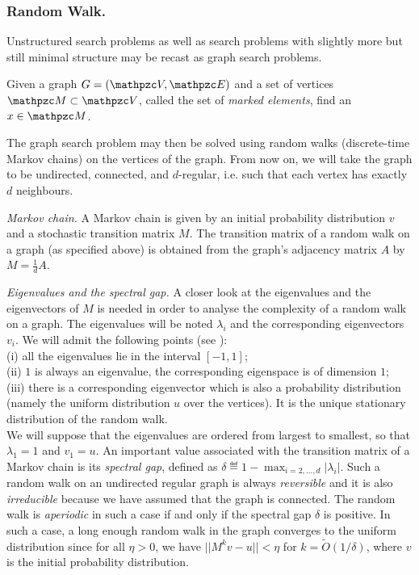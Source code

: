 \subsubsection{Random Walk.}
Unstructured search problems as well as search problems with slightly more but still minimal structure may be recast as graph search problems.
\begin{problem}
Given a graph $G=(\zV,\zE)$ and a set of vertices $\zM \subset \zV$, called the set of \textit{marked elements}, find an $x \in \zM$.
\end{problem}
The graph search problem may then be solved using random walks (discrete-time Markov chains) on the vertices of the graph.
From now on, we will take the graph to be undirected, connected, and $d$-regular, i.e. such that each vertex has exactly $d$ neighbours.
\par{\em Markov chain.}
A Markov chain is given by an initial probability distribution $v$ and a stochastic transition matrix $M$. The transition matrix of a random walk on a graph (as specified above) is obtained from the graph's adjacency matrix $A$ by
$M=\frac{1}{d}A$.
\par{\em Eigenvalues and the spectral gap.}
A closer look at the eigenvalues and the eigenvectors of $M$ is needed in order to analyse the complexity of a random walk on a graph.
The eigenvalues will be noted $\lambda_i$ and the corresponding eigenvectors $v_i$. We will admit the following points (see \cite{CDS80}):\\
(i) all the eigenvalues lie in the interval $[-1,1]$;\\
 (ii) $1$ is always an eigenvalue, the corresponding eigenspace is of dimension $1$;\\
(iii) there is a corresponding eigenvector which is also a probability distribution (namely the uniform distribution $u$ over the vertices). 
It is the unique stationary distribution of the random walk.\\
  We will suppose that the eigenvalues are ordered from largest to smallest, so that $\lambda_1=1$ and $v_1=u$.
An important value associated with the transition matrix of a Markov chain is its \textit{spectral gap}, defined as 
$\delta \eqdef  1 - \max_{i=2,...,d}|\lambda_i|$.
Such a random walk on an undirected regular graph is always {\em reversible} and it is also {\em irreducible} because we have assumed that the graph is 
connected. The random walk is {\em aperiodic} in such a case if and only if the spectral gap $\delta$ is positive. In such a case,  a long enough random walk in the graph converges to the uniform distribution since for all $\eta>0$, we have $||M^kv - u|| < \eta$ for $k=\tilde O(1/\delta)$, where $v$ is the initial probability distribution.
 

